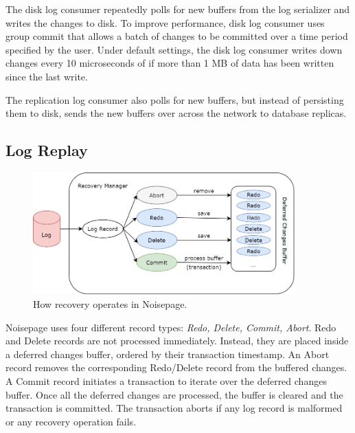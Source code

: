 \documentclass[12pt]{cmuthesis}
\begin{document}
The disk log consumer repeatedly polls for new buffers from the log serializer and writes the changes to disk. To improve performance, disk log consumer uses group commit that allows a batch of changes to be committed over a time period specified by the user. Under default settings, the disk log consumer writes down changes every 10 microseconds of if more than 1 MB of data has been written since the last write.

The replication log consumer also polls for new buffers, but instead of persisting them to disk, sends the new buffers over across the network to database replicas.

\subsection{Log Replay}
\begin{figure}[H]
\centering
\includegraphics[width=0.9\textwidth]{images/RecoveryManager.png}
\caption{How recovery operates in Noisepage.}
\label{fig:recoverymanager}
\end{figure}

Noisepage uses four different record types: \textit{Redo, Delete, Commit, Abort}. Redo and Delete records are not processed immediately. Instead, they are placed inside a deferred changes buffer, ordered by their transaction timestamp. An Abort record removes the corresponding Redo/Delete record from the buffered changes. A Commit record initiates a transaction to iterate over the deferred changes buffer. Once all the deferred changes are processed, the buffer is cleared and the transaction is committed. The transaction aborts if any log record is malformed or any recovery operation fails.
\end{document}
